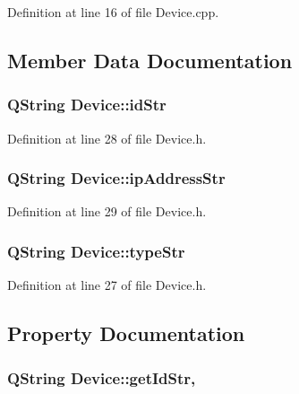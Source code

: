 Definition at line 16 of file Device.\-cpp.



\subsection{Member Data Documentation}
\hypertarget{class_device_a623ee34de671f4d315dc3ebdd3b75511}{
\subsubsection[{id\-Str}]{\setlength{\rightskip}{0pt plus 5cm}Q\-String Device\-::id\-Str\hspace{0.3cm}{\ttfamily [private]}}}\label{class_device_a623ee34de671f4d315dc3ebdd3b75511}


Definition at line 28 of file Device.\-h.

\hypertarget{class_device_a6ff849aa48a35c19d88da2603637d989}{
\subsubsection[{ip\-Address\-Str}]{\setlength{\rightskip}{0pt plus 5cm}Q\-String Device\-::ip\-Address\-Str\hspace{0.3cm}{\ttfamily [private]}}}\label{class_device_a6ff849aa48a35c19d88da2603637d989}


Definition at line 29 of file Device.\-h.

\hypertarget{class_device_aa89da4621bef2e58fc5e60f2733c6fe5}{
\subsubsection[{type\-Str}]{\setlength{\rightskip}{0pt plus 5cm}Q\-String Device\-::type\-Str\hspace{0.3cm}{\ttfamily [private]}}}\label{class_device_aa89da4621bef2e58fc5e60f2733c6fe5}


Definition at line 27 of file Device.\-h.



\subsection{Property Documentation}
\hypertarget{class_device_a2678e22bc05b7bb8deebffc726021038}{
\subsubsection[{get\-Id\-Str}]{\setlength{\rightskip}{0pt plus 5cm}Q\-String Device\-::get\-Id\-Str\hspace{0.3cm}{\ttfamily [read]}, {\ttfamily [write]}}}\label{class_device_a2678e22bc05b7bb8deebffc726021038}


